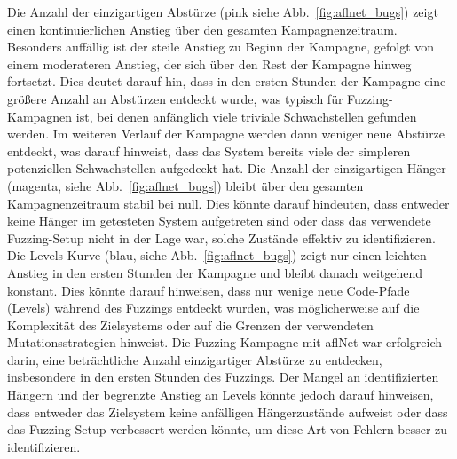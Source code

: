 \noindent Die Anzahl der einzigartigen Abstürze (pink siehe Abb.~\ref{fig:aflnet_bugs}) zeigt einen kontinuierlichen Anstieg über den gesamten Kampagnenzeitraum.
Besonders auffällig ist der steile Anstieg zu Beginn der Kampagne, gefolgt von einem moderateren Anstieg, der sich über
den Rest der Kampagne hinweg fortsetzt.
Dies deutet darauf hin, dass in den ersten Stunden der Kampagne eine größere Anzahl an Abstürzen entdeckt wurde, was
typisch für Fuzzing-Kampagnen ist, bei denen anfänglich viele triviale Schwachstellen gefunden werden.
Im weiteren Verlauf der Kampagne werden dann weniger neue Abstürze entdeckt, was darauf hinweist, dass das System bereits
viele der simpleren potenziellen Schwachstellen aufgedeckt hat.
Die Anzahl der einzigartigen Hänger (magenta, siehe Abb.~\ref{fig:aflnet_bugs}) bleibt über den gesamten Kampagnenzeitraum stabil bei null.
Dies könnte darauf hindeuten, dass entweder keine Hänger im getesteten System aufgetreten sind oder dass das verwendete
Fuzzing-Setup nicht in der Lage war, solche Zustände effektiv zu identifizieren.
Die Levels-Kurve (blau, siehe Abb.~\ref{fig:aflnet_bugs}) zeigt nur einen leichten Anstieg in den ersten Stunden der Kampagne und bleibt danach weitgehend konstant.
Dies könnte darauf hinweisen, dass nur wenige neue Code-Pfade (Levels) während des Fuzzings entdeckt wurden, was
möglicherweise auf die Komplexität des Zielsystems oder auf die Grenzen der verwendeten Mutationsstrategien hinweist.
Die Fuzzing-Kampagne mit \gls{afl}Net war erfolgreich darin, eine beträchtliche Anzahl einzigartiger Abstürze zu entdecken,
insbesondere in den ersten Stunden des Fuzzings.
Der Mangel an identifizierten Hängern und der begrenzte Anstieg an Levels könnte jedoch darauf hinweisen, dass entweder
das Zielsystem keine anfälligen Hängerzustände aufweist oder dass das Fuzzing-Setup verbessert werden könnte, um diese
Art von Fehlern besser zu identifizieren.
